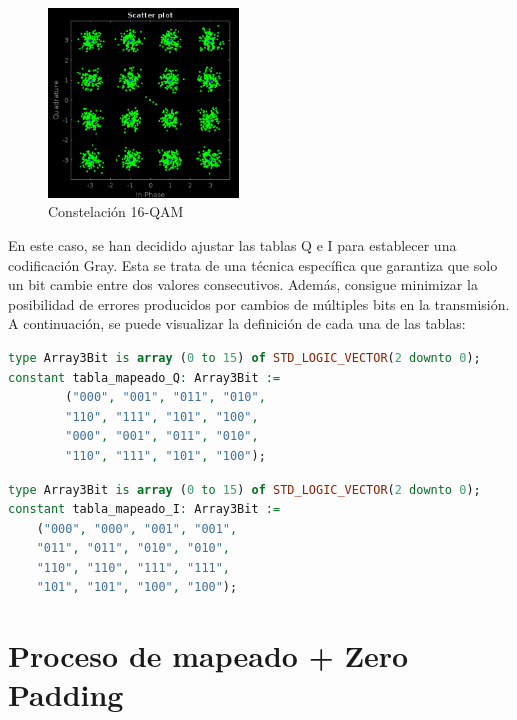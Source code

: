 \begin{figure}[h]
	\centering
	\includegraphics[width=0.45\textwidth]{img/matlab/qam.PNG}
	\caption{Constelación 16-QAM}
	\label{fig:qam}
\end{figure}

\vspace{3mm}
   
En este caso, se han decidido ajustar las tablas Q e I para establecer una codificación Gray. Esta se trata de una técnica específica que garantiza que solo un bit cambie entre dos valores consecutivos. Además, consigue minimizar la posibilidad de errores producidos por cambios de múltiples bits en la transmisión. A continuación, se puede visualizar la definición de cada una de las tablas:

\vspace{3mm}

\begin{lstlisting}[language=VHDL, style=mystyle, caption={Definición de la tabla de mapeado Q}]
type Array3Bit is array (0 to 15) of STD_LOGIC_VECTOR(2 downto 0);
constant tabla_mapeado_Q: Array3Bit :=
		("000", "001", "011", "010", 
		"110", "111", "101", "100",
		"000", "001", "011", "010", 
		"110", "111", "101", "100");
\end{lstlisting}

\vspace{5mm}

\begin{lstlisting}[language=VHDL, style=mystyle, caption={Definición de la tabla de mapeado I}]
type Array3Bit is array (0 to 15) of STD_LOGIC_VECTOR(2 downto 0);
constant tabla_mapeado_I: Array3Bit := 
	("000", "000", "001", "001", 
	"011", "011", "010", "010",
	"110", "110", "111", "111", 
	"101", "101", "100", "100");
\end{lstlisting}

\pagebreak

\section{Proceso de mapeado + Zero Padding}

